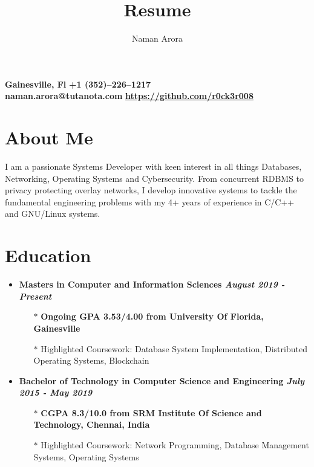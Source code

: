 \documentclass[10pt,a4paper]{article}
\makeatletter
\renewcommand{\maketitle}
{
	\begin{flushleft}
		\textbf{\Huge\theauthor}
	\end{flushleft}
	\begin{flushleft}
		\small{\textbf{{\faMapMarker} \hspace{0.2cm} Gainesville, Fl} \hspace{2.5cm} \textbf{{\faMobile} \hspace{0.2cm} +1 (352)--226--1217} \\
				\textbf{{\faEnvelope} \hspace{0.1cm} naman.arora@tutanota.com} \hspace{0.5cm}
				\textbf{{\faGithub} \hspace{0.1cm} \href{https://github.com/r0ck3r008}{https://github.com/r0ck3r008}}}
	\end{flushleft}
}
\makeatother
\begin{document}
\title{Resume}
\author{Naman Arora}
\maketitle


\section{{\faUser} About Me}
\begin{flushleft}
	I am a passionate Systems Developer with keen interest in all things Databases, Networking, Operating Systems and Cybersecurity. From concurrent RDBMS to privacy protecting overlay networks, I develop innovative systems to tackle the fundamental engineering problems with my 4+ years of experience in C/C++ and GNU/Linux systems.
\end{flushleft}

\section{{\faUniversity} Education}

\begin{itemize}[noitemsep,nolistsep]
	\item\textbf{Masters in Computer and Information Sciences \hfill \textit{August 2019 - Present}}
		\begin{itemize}[leftmargin=*]
			\setlength\itemsep{-0.25em}
			\item[$\ast$]\textbf{Ongoing GPA 3.53/4.00 from University Of Florida, Gainesville}
			\item[$\ast$]Highlighted Coursework: Database System Implementation, Distributed Operating Systems, Blockchain
		\end{itemize}
	\item\textbf{Bachelor of Technology in Computer Science and Engineering \hfill \textit{July 2015 - May 2019}}
		\begin{itemize}[leftmargin=*]
			\setlength\itemsep{-0.25em}
			\item[$\ast$]\textbf{CGPA 8.3/10.0 from SRM Institute Of Science and Technology, Chennai, India}
			\item[$\ast$]Highlighted Coursework: Network Programming, Database Management Systems, Operating Systems
		\end{itemize}
\end{itemize}
\end{document}
